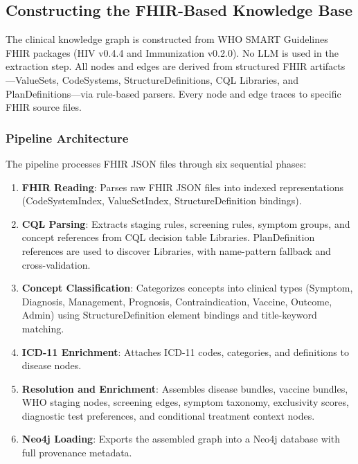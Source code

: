 
\subsection{Constructing the FHIR-Based Knowledge Base}
The clinical knowledge graph is constructed from WHO SMART Guidelines FHIR packages (HIV v0.4.4 and Immunization v0.2.0). No LLM is used in the extraction step. All nodes and edges are derived from structured FHIR artifacts---ValueSets, CodeSystems, StructureDefinitions, CQL Libraries, and PlanDefinitions---via rule-based parsers. Every node and edge traces to specific FHIR source files.

\subsubsection{Pipeline Architecture}

The pipeline processes FHIR JSON files through six sequential phases:

\begin{enumerate}
    \item \textbf{FHIR Reading}: Parses raw FHIR JSON files into indexed representations (CodeSystemIndex, ValueSetIndex, StructureDefinition bindings).
    \item \textbf{CQL Parsing}: Extracts staging rules, screening rules, symptom groups, and concept references from CQL decision table Libraries. PlanDefinition references are used to discover Libraries, with name-pattern fallback and cross-validation.
    \item \textbf{Concept Classification}: Categorizes concepts into clinical types (Symptom, Diagnosis, Management, Prognosis, Contraindication, Vaccine, Outcome, Admin) using StructureDefinition element bindings and title-keyword matching.
    \item \textbf{ICD-11 Enrichment}: Attaches ICD-11 codes, categories, and definitions to disease nodes.
    \item \textbf{Resolution and Enrichment}: Assembles disease bundles, vaccine bundles, WHO staging nodes, screening edges, symptom taxonomy, exclusivity scores, diagnostic test preferences, and conditional treatment context nodes.
    \item \textbf{Neo4j Loading}: Exports the assembled graph into a Neo4j database with full provenance metadata.
\end{enumerate}

